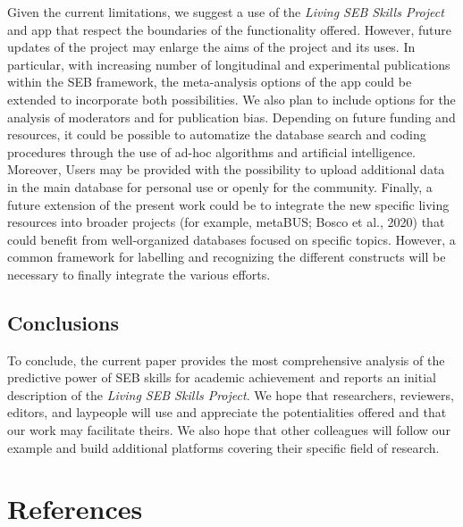 \documentclass[
  man,
  longtable,
  nolmodern,
  notxfonts,
  notimes,
  colorlinks=true,linkcolor=blue,citecolor=blue,urlcolor=blue]{apa7}
\begin{document}
Given the current limitations, we suggest a use of the \emph{Living SEB
Skills Project} and app that respect the boundaries of the functionality
offered. However, future updates of the project may enlarge the aims of
the project and its uses. In particular, with increasing number of
longitudinal and experimental publications within the SEB framework, the
meta-analysis options of the app could be extended to incorporate both
possibilities. We also plan to include options for the analysis of
moderators and for publication bias. Depending on future funding and
resources, it could be possible to automatize the database search and
coding procedures through the use of ad-hoc algorithms and artificial
intelligence. Moreover, Users may be provided with the possibility to
upload additional data in the main database for personal use or openly
for the community. Finally, a future extension of the present work could
be to integrate the new specific living resources into broader projects
(for example, metaBUS; Bosco et al., 2020) that could benefit from
well-organized databases focused on specific topics. However, a common
framework for labelling and recognizing the different constructs will be
necessary to finally integrate the various efforts.

\subsection{Conclusions}\label{conclusions}

To conclude, the current paper provides the most comprehensive analysis
of the predictive power of SEB skills for academic achievement and
reports an initial description of the \emph{Living SEB Skills Project}.
We hope that researchers, reviewers, editors, and laypeople will use and
appreciate the potentialities offered and that our work may facilitate
theirs. We also hope that other colleagues will follow our example and
build additional platforms covering their specific field of research.

\newpage

\section{References}\label{references}
\end{document}
